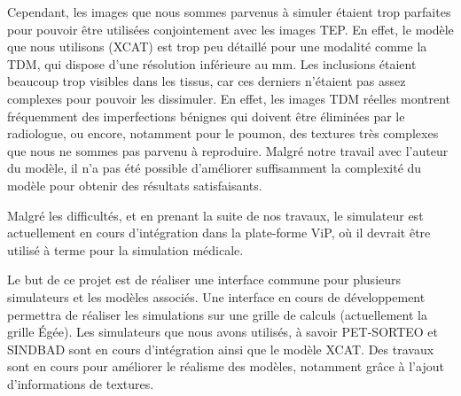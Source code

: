 Cependant, les images que nous sommes parvenus à simuler étaient trop parfaites pour pouvoir être utilisées conjointement avec les images TEP. En effet, le modèle que nous utilisons (XCAT) est trop peu détaillé pour une modalité comme la TDM, qui dispose d'une résolution inférieure au mm. Les inclusions étaient beaucoup trop visibles dans les tissus, car ces derniers n'étaient pas assez complexes pour pouvoir les dissimuler. En effet, les images TDM réelles montrent fréquemment des imperfections bénignes qui doivent être éliminées par le radiologue, ou encore, notamment pour le poumon, des textures très complexes que nous ne sommes pas parvenu à reproduire. Malgré notre travail avec l'auteur du modèle, il n'a pas été possible d'améliorer suffisamment la complexité du modèle pour obtenir des résultats satisfaisants.

Malgré les difficultés, et en prenant la suite de nos travaux, le simulateur est actuellement en cours d'intégration dans la plate-forme ViP, où il devrait être utilisé à terme pour la simulation médicale.

Le but de ce projet est de réaliser une interface commune pour plusieurs simulateurs et les modèles associés. Une interface en cours de développement permettra de réaliser les simulations sur une grille de calculs (actuellement la grille Égée). Les simulateurs que nous avons utilisés, à savoir PET-SORTEO et SINDBAD sont en cours d'intégration ainsi que le modèle XCAT. Des travaux sont en cours pour améliorer le réalisme des modèles, notamment grâce à l'ajout d'informations de textures. 














